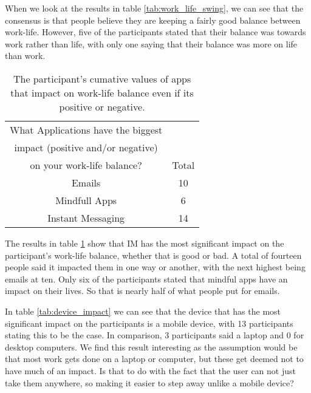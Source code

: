\documentclass{sigchi}
\begin{document}
	
	When we look at the results in table \ref{tab:work_life_swing}, we can see that the consensus is that people believe they are keeping a fairly good balance between work-life. However, five of the participants stated that their balance was towards work rather than life, with only one saying that their balance was more on life than work. 


	\begin{table}[ht]
		\centering
		\small
		\begin{tabular}[t]{ |c| c | }
			\hline
			What Applications have the biggest & \\
			impact (positive and/or negative) & \\
			on your work-life balance?  & Total  \\ 
			\hline
			Emails & 10 \\ 
			\hline
			Mindfull Apps & 6  \\ 
			\hline
			Instant Messaging &  14 \\
			\hline
			
		\end{tabular}
		\caption{The participant's cumative values of apps that impact on work-life balance even if its positive or negative.}
		\label{tab:app_impact}
	\end{table}%

	The results in table \ref{tab:app_impact} show that IM has the most significant impact on the participant's work-life balance, whether that is good or bad. A total of fourteen people said it impacted them in one way or another, with the next highest being emails at ten. Only six of the participants stated that mindful apps have an impact on their lives. So that is nearly half of what people put for emails.
	
	
	In table \ref{tab:device_impact} we can see that the device that has the most significant impact on the participants is a mobile device, with 13 participants stating this to be the case. In comparison, 3 participants said a laptop and 0 for desktop computers. We find this result interesting as the assumption would be that most work gets done on a laptop or computer, but these get deemed not to have much of an impact. Is that to do with the fact that the user can not just take them anywhere, so making it easier to step away unlike a mobile device?
	
\end{document}
